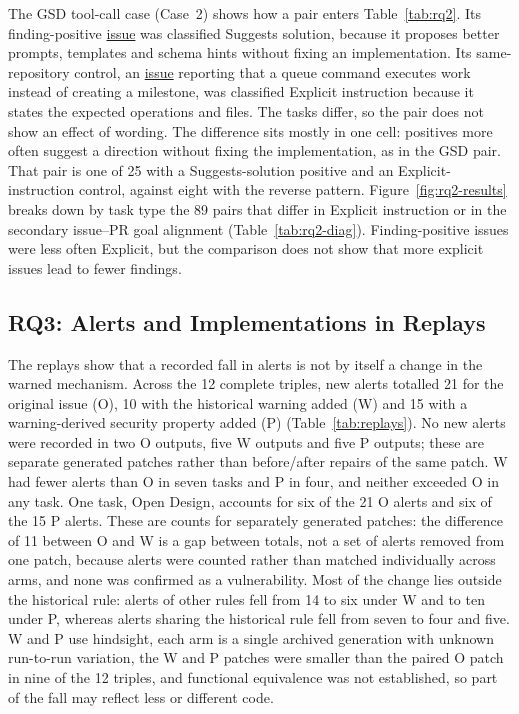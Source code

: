 \documentclass[acmsmall,screen,nonacm]{acmart}
\begin{document}
The GSD tool-call case (Case~2) shows how a pair enters Table~\ref{tab:rq2}. Its finding-positive \href{https://github.com/gsd-build/gsd-2/issues/2660}{issue} was classified Suggests solution, because it proposes better prompts, templates and schema hints without fixing an implementation. Its same-repository control, an \href{https://github.com/gsd-build/gsd-2/issues/2545}{issue} reporting that a queue command executes work instead of creating a milestone, was classified Explicit instruction because it states the expected operations and files. The tasks differ, so the pair does not show an effect of wording. The difference sits mostly in one cell: positives more often suggest a direction without fixing the implementation, as in the GSD pair. That pair is one of 25 with a Suggests-solution positive and an Explicit-instruction control, against eight with the reverse pattern. Figure~\ref{fig:rq2-results} breaks down by task type the 89 pairs that differ in Explicit instruction or in the secondary issue--PR goal alignment (Table~\ref{tab:rq2-diag}). Finding-positive issues were less often Explicit, but the comparison does not show that more explicit issues lead to fewer findings.

\subsection{RQ3: Alerts and Implementations in Replays}\label{sec:rq3-res}



The replays show that a recorded fall in alerts is not by itself a change in the warned mechanism. Across the 12 complete triples, new alerts totalled 21 for the original issue (O), 10 with the historical warning added (W) and 15 with a warning-derived security property added (P) (Table~\ref{tab:replays}). No new alerts were recorded in two O outputs, five W outputs and five P outputs; these are separate generated patches rather than before/after repairs of the same patch. W had fewer alerts than O in seven tasks and P in four, and neither exceeded O in any task. One task, Open Design, accounts for six of the 21 O alerts and six of the 15 P alerts. These are counts for separately generated patches: the difference of 11 between O and W is a gap between totals, not a set of alerts removed from one patch, because alerts were counted rather than matched individually across arms, and none was confirmed as a vulnerability. Most of the change lies outside the historical rule: alerts of other rules fell from 14 to six under W and to ten under P, whereas alerts sharing the historical rule fell from seven to four and five. W and P use hindsight, each arm is a single archived generation with unknown run-to-run variation, the W and P patches were smaller than the paired O patch in nine of the 12 triples, and functional equivalence was not established, so part of the fall may reflect less or different code.
\end{document}
